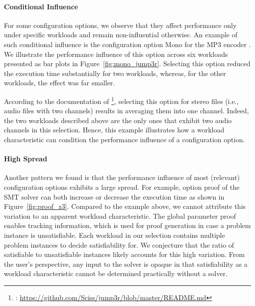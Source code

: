 {{{{\paragraph{Conditional Influence}\label{sec:conditional_influence} For some configuration options, we observe that they affect performance only under specific workloads and remain non-influential otherwise. An example of such conditional influence is the configuration option \textsf{Mono} for the MP3 encoder \jumper. We illustrate the performance influence of this option across six workloads presented as bar plots in Figure~\ref{fig:mono_jump3r}. Selecting this option reduced the execution time substantially for two workloads, whereas, for the other workloads, the effect was far smaller.

According to the documentation of \jumper\footnote{\jumper: \url{https://github.com/Sciss/jump3r/blob/master/README.md}}, selecting this option for stereo files (i.e., audio files with two channels) results in averaging them into one channel. Indeed, the two workloads described above are the only ones that exhibit two audio channels in this selection. Hence, this example illustrates how a workload  characteristic can condition the performance influence of a configuration option. 

\paragraph{High Spread} Another pattern we found is that the performance influence of most (relevant) configuration options exhibits a large spread. For example, option \textsf{proof} of the SMT solver \zdrei can both increase or decrease the execution time as shown in Figure~\ref{fig:proof_z3}. Compared to the example above, we cannot attribute this variation to an apparent workload characteristic.
The global parameter \textsf{proof} enables tracking information, which is used for proof generation in case a problem instance is unsatisfiable. Each workload in our selection contains multiple problem instances to decide satisfiability for. We conjecture that the ratio of satisfiable to unsatisfiable instances likely accounts for this high variation. From the user's perspective, any input to the solver is opaque in that satisfiability as a workload characteristic cannot be determined practically without a solver. 
}}}}
